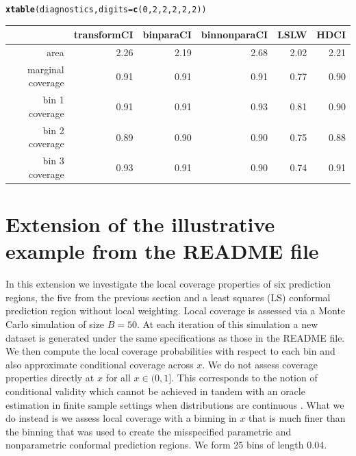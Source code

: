 \documentclass[11pt]{article}\usepackage[]{graphicx}\usepackage[]{color}
\makeatletter
\newcommand{\hlnum}[1]{\textcolor[rgb]{0.686,0.059,0.569}{#1}}%
\newcommand{\hlstd}[1]{\textcolor[rgb]{0.345,0.345,0.345}{#1}}%
\newcommand{\hlkwc}[1]{\textcolor[rgb]{0.333,0.667,0.333}{#1}}%
\newcommand{\hlkwd}[1]{\textcolor[rgb]{0.737,0.353,0.396}{\textbf{#1}}}%
\newenvironment{kframe}{%
 \def\at@end@of@kframe{}%
 \ifinner\ifhmode%
  \def\at@end@of@kframe{\end{minipage}}%
  \begin{minipage}{\columnwidth}%
 \fi\fi%
 \def\FrameCommand##1{\hskip\@totalleftmargin \hskip-\fboxsep
 \colorbox{shadecolor}{##1}\hskip-\fboxsep
     \hskip-\linewidth \hskip-\@totalleftmargin \hskip\columnwidth}%
 \MakeFramed {\advance\hsize-\width
   \@totalleftmargin\z@ \linewidth\hsize
   \@setminipage}}%
 {\par\unskip\endMakeFramed%
 \at@end@of@kframe}
\makeatother
\begin{document}
\begin{kframe}
\begin{alltt}
\hlkwd{xtable}\hlstd{(diagnostics,} \hlkwc{digits} \hlstd{=} \hlkwd{c}\hlstd{(}\hlnum{0}\hlstd{,} \hlnum{2}\hlstd{,} \hlnum{2}\hlstd{,} \hlnum{2}\hlstd{,} \hlnum{2}\hlstd{,} \hlnum{2}\hlstd{))}
\end{alltt}
\end{kframe}%
\begin{table}[ht]
\centering
\begin{tabular}{rrrrrr}
  \hline
 & transformCI & binparaCI & binnonparaCI & LSLW & HDCI \\ 
  \hline
area & 2.26 & 2.19 & 2.68 & 2.02 & 2.21 \\ 
  marginal coverage & 0.91 & 0.91 & 0.91 & 0.77 & 0.90 \\ 
  bin 1 coverage & 0.91 & 0.91 & 0.93 & 0.81 & 0.90 \\ 
  bin 2 coverage & 0.89 & 0.90 & 0.90 & 0.75 & 0.88 \\ 
  bin 3 coverage & 0.93 & 0.91 & 0.90 & 0.74 & 0.91 \\ 
   \hline
\end{tabular}
\end{table}



\section{Extension of the illustrative example from the README file}

In this extension we investigate the local coverage properties of six  
prediction regions, the five from the previous section and a least squares 
(LS) conformal prediction region without local weighting.  Local coverage is 
assessed via a Monte Carlo simulation of size $B = 50$.  At each iteration 
of this simulation a new dataset is generated under the same specifications 
as those in the README file.  We then compute the local coverage probabilities 
with respect to each bin and also approximate conditional coverage across $x$.  
We do not assess coverage properties directly at $x$ for all $x \in (0,1]$.  
This corresponds to the notion of conditional validity which cannot be 
achieved in tandem with an oracle estimation in finite sample settings when 
distributions are continuous \citep[Section 2.2]{lei2014distribution}.  
What we do instead is we assess local coverage with a binning in $x$ that is 
much finer than the binning that was used to create the misspecified 
parametric and nonparametric conformal prediction regions.  We form 25 bins 
of length 0.04. 
\end{document}
